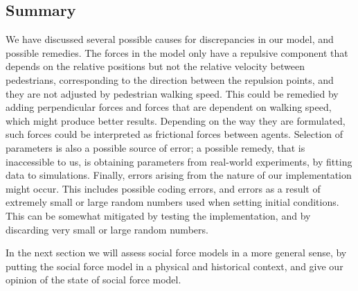 \subsection{Summary}
We have discussed several possible causes for discrepancies in our model, and 
possible remedies. The forces in the model only have a repulsive component that 
depends on the relative positions but not the relative velocity between pedestrians, 
corresponding to the direction between the repulsion points, and they are not 
adjusted by pedestrian walking speed. This could be remedied by adding 
perpendicular forces and forces that are dependent on walking speed, which 
might produce better results. Depending on the way they are formulated, such 
forces could be interpreted as frictional forces between agents. Selection of 
parameters is also a possible source of error; a possible remedy, that is 
inaccessible to us, is obtaining parameters from real-world experiments, by 
fitting data to simulations. Finally, errors arising from the nature of our 
implementation might occur. This includes possible coding errors, and errors 
as a result of extremely small or large random numbers used when setting 
initial conditions.  This can be somewhat mitigated by testing the 
implementation, and by discarding very small or large random numbers.

In the next section we will assess social force models in a more general sense, 
by putting the social force model in a physical and historical context, and give 
our opinion of the state of social force model.
